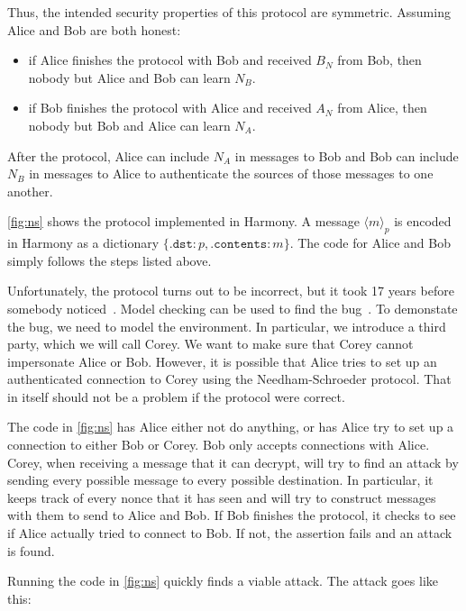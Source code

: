 \documentclass{report}
\begin{document}
{Thus, the intended security properties of this protocol are symmetric.
Assuming Alice and Bob are both honest:
\begin{itemize}
\item if Alice finishes the protocol with Bob and received $B_N$ from Bob, then
nobody but Alice and Bob can learn $N_B$.
\item if Bob finishes the protocol with Alice and received $A_N$ from Alice, then
nobody but Bob and Alice can learn $N_A$.
\end{itemize}

After the protocol, Alice can include $N_A$ in messages to Bob and Bob can
include $N_B$ in messages to Alice to authenticate the sources of those messages
to one another.

\autoref{fig:ns} shows the protocol implemented in Harmony.
A message $\langle m \rangle_p$ is encoded in Harmony as a dictionary
$\{ \mathtt{.dst}: p, \mathtt{.contents}: m \}$.  The code for Alice and Bob
simply follows the steps listed above.

Unfortunately, the protocol turns out to be incorrect, but it took 17 years before
somebody noticed~\cite{Lowe95}.  Model checking can be used to find the bug~\cite{Lowe96}.
To demonstate the bug, we need to model the environment.
In particular, we introduce a third party, which we will call Corey.
We want to make sure that Corey cannot impersonate Alice or Bob.
However, it is possible that Alice tries to set up an authenticated connection to Corey
using the Needham-Schroeder protocol.  That in itself should not be a problem if the
protocol were correct.

The code in \autoref{fig:ns} has Alice either not do anything, or has Alice try to set
up a connection to either Bob
or Corey.  Bob only accepts connections with Alice.  Corey, when receiving a message
that it can decrypt, will try to find an attack by sending every possible message to
every possible destination.  In particular, it keeps track of every nonce that it has
seen and will try to construct messages with them to send to Alice and Bob.
If Bob finishes the protocol, it checks to see if Alice actually tried to connect
to Bob.  If not, the assertion fails and an attack is found.

Running the code in \autoref{fig:ns} quickly finds a viable attack.  The attack goes
like this:

}
\end{document}
